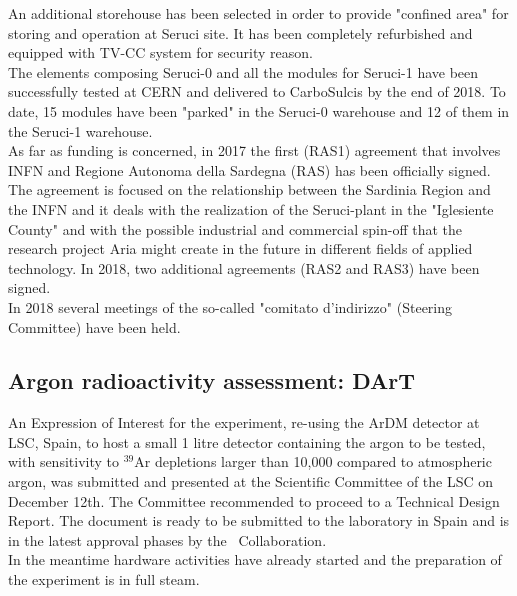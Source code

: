 An additional storehouse has been selected in order to provide "confined area" for storing and operation at Seruci site. It has been completely refurbished and equipped with TV-CC system for security reason.\\
The elements composing Seruci-0 and all the modules for Seruci-1 have been successfully tested at CERN and delivered to CarboSulcis by the end of 2018. To date, 15 modules have been "parked" in the Seruci-0 warehouse and 12 of them in the Seruci-1 warehouse. \\
As far as funding is concerned, in 2017 the first (RAS1) agreement that involves INFN and Regione Autonoma della Sardegna (RAS) has been officially signed. The agreement is focused on the relationship between the Sardinia Region and the INFN and it deals with the realization of the Seruci-plant in the "Iglesiente County" and with the possible industrial and commercial spin-off that the research project Aria might create in the future in different fields of applied technology. In 2018, two additional agreements (RAS2 and RAS3) have been signed.\\
In 2018 several meetings of the so-called "comitato d'indirizzo" (Steering Committee) have been held.











\subsection{Argon radioactivity assessment: DArT}
\label{sec:Ar-DArT}

An Expression of Interest for the experiment, re-using the ArDM detector at LSC, Spain, to host a small 1 litre detector containing the argon to be tested, with sensitivity to $^{39}$Ar depletions larger than 10,000 compared to atmospheric argon,   was submitted and presented at the Scientific Committee of the LSC on December 12th. The Committee recommended to proceed to a Technical Design Report.  The document is ready to be submitted to the  laboratory in Spain and is in the latest approval phases by the \DSk\ Collaboration.\\
In the meantime hardware activities have already started and the preparation of the experiment is in full steam.





